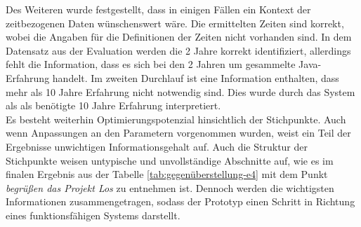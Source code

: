 Des Weiteren wurde festgestellt, dass in einigen Fällen ein Kontext der zeitbezogenen Daten wünschenswert wäre. Die ermittelten Zeiten sind korrekt, wobei die Angaben für die Definitionen der Zeiten nicht vorhanden sind. In dem Datensatz aus der Evaluation werden die 2 Jahre korrekt identifiziert, allerdings fehlt die Information, dass es sich bei den 2 Jahren um gesammelte Java-Erfahrung handelt. Im zweiten Durchlauf ist eine Information enthalten, dass mehr als 10 Jahre Erfahrung nicht notwendig sind. Dies wurde durch das System als als benötigte 10 Jahre Erfahrung interpretiert.\\

Es besteht weiterhin Optimierungspotenzial hinsichtlich der Stichpunkte. Auch wenn Anpassungen an den Parametern vorgenommen wurden, weist ein Teil der Ergebnisse unwichtigen Informationsgehalt auf. Auch die Struktur der Stichpunkte weisen untypische und unvollständige Abschnitte auf, wie es im finalen Ergebnis aus der Tabelle \ref{tab:gegenüberstellung-e4} mit dem Punkt \emph{begrüßen das Projekt Los} zu entnehmen ist. Dennoch werden die wichtigsten Informationen zusammengetragen, sodass der Prototyp einen Schritt in Richtung eines funktionsfähigen Systems darstellt.
\newpage
